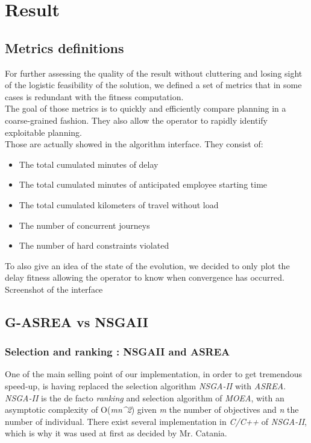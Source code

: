 \documentclass[12pt]{memoir}
\begin{document}
\newpage

\section{Result}
\subsection{Metrics definitions}
For further assessing the quality of the result without cluttering and losing sight
of the logistic feasibility of the solution, we defined a set of metrics that in some
cases is redundant with the fitness computation. \\
The goal of those metrics is to quickly and efficiently compare planning in a coarse-grained
fashion. They also allow the operator to rapidly identify exploitable planning.\\
Those are actually showed in the algorithm interface. They consist of: 
\begin{itemize}
  \item The total cumulated minutes of delay
  \item The total cumulated minutes of anticipated employee starting time
  \item The total cumulated kilometers of travel without load
  \item The number of concurrent journeys
  \item The number of hard constraints violated
\end{itemize}
To also give an idea of the state of the evolution, we decided to only plot the delay
fitness allowing the operator to know when convergence has occurred.
Screenshot of the interface
\subsection{G-ASREA vs NSGAII}
\subsubsection{Selection and ranking : NSGAII and
	ASREA}\label{suxe9lection-et-ranking-nsgaii-et-asrea}

One of the main selling point of our implementation, in order to get tremendous speed-up,
is having replaced the selection algorithm \emph{NSGA-II\cite{deb2002fast}} with \emph{ASREA\cite{sharma2010archived,tsutsui2013massively}}.\\

\emph{NSGA-II} is the de facto \emph{ranking} and selection algorithm of
\emph{MOEA}, with an asymptotic complexity of O(\emph{mn\^{}2}) given \emph{m}
the number of objectives and \emph{n} the number of individual.
There exist several implementation in \emph{C/C++} of \emph{NSGA-II}, which is
why it was used at first as decided by  Mr. Catania.\\
\end{document}
